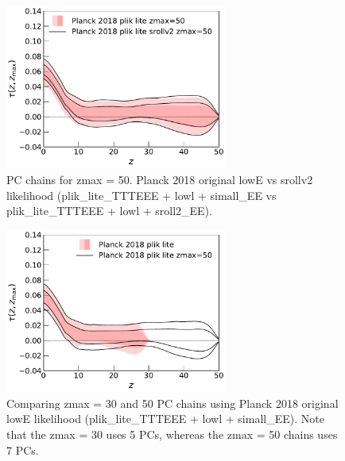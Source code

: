\documentclass[prd,amsmath,amssymb,floatfix,superscriptaddress,nofootinbib]{revtex4-1}
\begin{document}
\begin{figure}
\includegraphics[width=0.65\textwidth]{results/direct_mcmc/pl18_plots_zmax50/plot_pub_tau_gtz_dz_0p1_pl18_pc_zmax50_pliklite_post_and_pl18_pc_zmax50_pliklite_srollv2.pdf}
\caption{PC chains for zmax = 50. Planck 2018 original lowE vs srollv2 likelihood (plik\_lite\_TTTEEE + lowl + simall\_EE vs plik\_lite\_TTTEEE + lowl + sroll2\_EE).
}
\label{fig:}
\end{figure}


\begin{figure}
\includegraphics[width=0.65\textwidth]{results/direct_mcmc/pl18_plots_zmax30/plot_pub_tau_gtz_dz_0p1_pl18_pc_zmax30_pliklite_post_0930_and_pl18_pc_zmax50_pliklite_post.pdf}
\caption{Comparing zmax = 30 and 50 PC chains using Planck 2018 original lowE likelihood (plik\_lite\_TTTEEE + lowl + simall\_EE). Note that the zmax = 30 uses 5 PCs, whereas the zmax = 50 chains uses 7 PCs.
}
\label{fig:tau_gtz_zmax_30_vs_50_simall_EE}
\end{figure}
\end{document}
